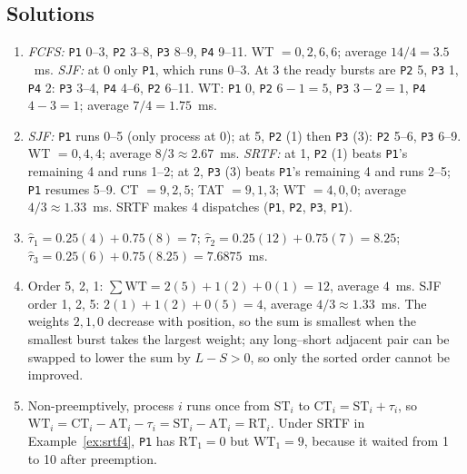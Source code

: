 \documentclass[11pt]{article}
\begin{document}
\subsection*{Solutions}
\begingroup\small
\begin{enumerate}
  \item \emph{FCFS:} \texttt{P1} 0--3, \texttt{P2} 3--8, \texttt{P3} 8--9,
        \texttt{P4} 9--11. WT $= 0, 2, 6, 6$; average $14/4 = 3.5$~ms.
        \emph{SJF:} at 0 only \texttt{P1}, which runs 0--3. At 3 the ready
        bursts are \texttt{P2} 5, \texttt{P3} 1, \texttt{P4} 2: \texttt{P3}
        3--4, \texttt{P4} 4--6, \texttt{P2} 6--11. WT: \texttt{P1} 0,
        \texttt{P2} $6-1 = 5$, \texttt{P3} $3-2 = 1$, \texttt{P4} $4-3 = 1$;
        average $7/4 = 1.75$~ms.
  \item \emph{SJF:} \texttt{P1} runs 0--5 (only process at 0); at 5,
        \texttt{P2} (1) then \texttt{P3} (3): \texttt{P2} 5--6, \texttt{P3}
        6--9. WT $= 0, 4, 4$; average $8/3 \approx 2.67$~ms.
        \emph{SRTF:} at 1, \texttt{P2} (1) beats \texttt{P1}'s remaining 4 and
        runs 1--2; at 2, \texttt{P3} (3) beats \texttt{P1}'s remaining 4 and runs
        2--5; \texttt{P1} resumes 5--9. CT $= 9, 2, 5$; TAT $= 9, 1, 3$;
        WT $= 4, 0, 0$; average $4/3 \approx 1.33$~ms. SRTF makes 4 dispatches
        (\texttt{P1}, \texttt{P2}, \texttt{P3}, \texttt{P1}).
  \item $\hat{\tau}_1 = 0.25(4) + 0.75(8) = 7$;
        $\hat{\tau}_2 = 0.25(12) + 0.75(7) = 8.25$;
        $\hat{\tau}_3 = 0.25(6) + 0.75(8.25) = 7.6875$~ms.
  \item Order 5, 2, 1: $\sum \mathrm{WT} = 2(5) + 1(2) + 0(1) = 12$, average
        $4$~ms. SJF order 1, 2, 5: $2(1) + 1(2) + 0(5) = 4$, average
        $4/3 \approx 1.33$~ms. The weights $2, 1, 0$ decrease with position, so
        the sum is smallest when the smallest burst takes the largest weight;
        any long--short adjacent pair can be swapped to lower the sum by
        $L - S > 0$, so only the sorted order cannot be improved.
  \item Non-preemptively, process $i$ runs once from $\mathrm{ST}_i$ to
        $\mathrm{CT}_i = \mathrm{ST}_i + \tau_i$, so
        $\mathrm{WT}_i = \mathrm{CT}_i - \mathrm{AT}_i - \tau_i =
        \mathrm{ST}_i - \mathrm{AT}_i = \mathrm{RT}_i$. Under SRTF in
        Example~\ref{ex:srtf4}, \texttt{P1} has $\mathrm{RT}_1 = 0$ but
        $\mathrm{WT}_1 = 9$, because it waited from 1 to 10 after preemption.
\end{enumerate}
\endgroup



\end{document}
